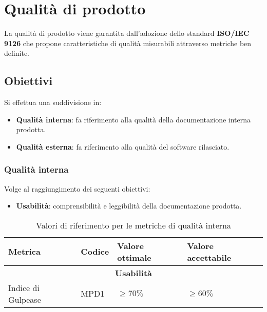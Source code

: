 \section{Qualità di prodotto}
La qualità di prodotto viene garantita dall'adozione dello standard \textbf{ISO/IEC 9126} che propone caratteristiche di qualità misurabili attraverso metriche ben definite.

\subsection{Obiettivi}
Si effettua una suddivisione in:
\begin{itemize}
    \item \textbf{Qualità interna}: fa riferimento alla qualità della documentazione interna prodotta.
    \item \textbf{Qualità esterna}: fa riferimento alla qualità del software rilasciato.
\end{itemize}

\subsubsection{Qualità interna}
Volge al raggiungimento dei seguenti obiettivi:
\begin{itemize}
    \item \textbf{Usabilità}: comprensibilità e leggibilità della documentazione prodotta.
\end{itemize}
\begin{table}[H]
    \centering
    \begin{tabularx}{\textwidth}{p{3.5cm}|X|l|l}
        \hline
        \textbf{Metrica} & \textbf{Codice}   & \textbf{Valore ottimale}  & \textbf{Valore accettabile}   \\
        \hline
        \multicolumn{4}{c}{\textbf{Usabilità}} \\
        \hline
        Indice di Gulpease & MPD1 &  $\ge 70\%$ & $\ge 60\%$    \\
        \hline
    \end{tabularx}
    \caption{Valori di riferimento per le metriche di qualità interna}
\end{table}


